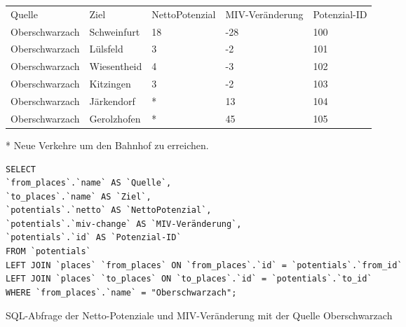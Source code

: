 \begin{tabular}{ l  l  l  l  l }
Quelle & Ziel & NettoPotenzial & MIV-Veränderung & Potenzial-ID\\ 
Oberschwarzach & Schweinfurt & 18 & -28 & 100\\ 
Oberschwarzach & Lülsfeld & 3 & -2 & 101\\ 
Oberschwarzach & Wiesentheid & 4 & -3 & 102\\ 
Oberschwarzach & Kitzingen & 3 & -2 & 103\\ 
Oberschwarzach & Järkendorf & * & 13 & 104\\ 
Oberschwarzach & Gerolzhofen & * & 45 & 105\\ 
\end{tabular}
\newline
\newline
* Neue Verkehre um den Bahnhof zu erreichen.
\newline
\begin{listing}[htbp]
\begin{verbatim}
SELECT
`from_places`.`name` AS `Quelle`, 
`to_places`.`name` AS `Ziel`, 
`potentials`.`netto` AS `NettoPotenzial`, 
`potentials`.`miv-change` AS `MIV-Veränderung`, 
`potentials`.`id` AS `Potenzial-ID`
FROM `potentials`
LEFT JOIN `places` `from_places` ON `from_places`.`id` = `potentials`.`from_id`
LEFT JOIN `places` `to_places` ON `to_places`.`id` = `potentials`.`to_id`
WHERE `from_places`.`name` = "Oberschwarzach";
\end{verbatim}
\caption{SQL-Abfrage der Netto-Potenziale und MIV-Veränderung mit der Quelle Oberschwarzach}\label{lst-fz-oberschwarzach}
\end{listing}